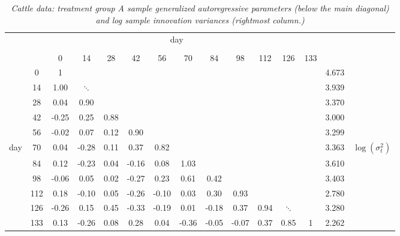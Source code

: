 \begin{table}[H] 
\begin{center}
\begin{tabular}{lc|ccccccccccc|cr}
 \multicolumn{14}{c}{day} \\
&&&&&&&&&&&&\\
& &  0 & 14 & 28 & 42 & 56 & 70 & 84 & 98 & 112 & 126 & 133  \\ 
  \cline{2-13}\noalign{\smallskip}  
&0 & 1 & &&&&&&&&& & 4.673& \\ 
&  14& 1.00 & $\ddots$&&&&&&&&&& 3.939 &\\ 
&  28 & 0.04 & 0.90 &  &&&&&&&&& 3.370&\\ 
&  42 & -0.25 & 0.25 & 0.88 &  &&&&&&&&3.000& \\ 
&  56 & -0.02 & 0.07 & 0.12 & 0.90 & &&&&&&& 3.299&\\ 
day &  70 & 0.04 & -0.28 & 0.11 & 0.37 & 0.82  &&&&&&& 3.363 & $\log\left(\sigma^2_t\right)$\\ 
 & 84 & 0.12 & -0.23 & 0.04 & -0.16 & 0.08 & 1.03  &&&&&& 3.610\\ 
 & 98 & -0.06 & 0.05 & 0.02 & -0.27 & 0.23 & 0.61 & 0.42 &&&&& 3.403&\\ 
 & 112 & 0.18 & -0.10 & 0.05 & -0.26 & -0.10 & 0.03 & 0.30 & 0.93&&&& 2.780&  \\ 
 & 126 & -0.26 & 0.15 & 0.45 & -0.33 & -0.19 & 0.01 & -0.18 & 0.37 & 0.94 & $\ddots$&&3.280& \\ 
 & 133 & 0.13 & -0.26 & 0.08 & 0.28 & 0.04 & -0.36 & -0.05 & -0.07 & 0.37 & 0.85 & 1  &2.262&\\ 
\end{tabular} 
\caption{\textit{Cattle data: treatment group A sample generalized autoregressive parameters (below the main diagonal) and log sample innovation variances (rightmost column.)}}\label{table:sample-regressogram-garps}
\end{center}
\end{table}

